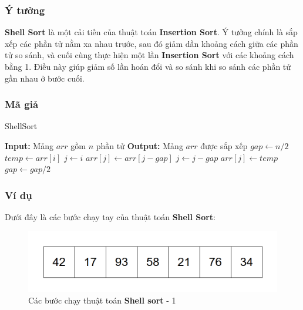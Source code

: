\subsubsection{Ý tưởng}
\textbf{Shell Sort} là một cải tiến của thuật toán \textbf{Insertion Sort}. Ý tưởng chính là sắp xếp các phần tử nằm xa nhau trước, sau đó giảm dần khoảng cách giữa các phần tử so sánh, và cuối cùng thực hiện một lần \textbf{Insertion Sort} với các khoảng cách bằng 1. Điều này giúp giảm số lần hoán đổi và so sánh khi so sánh các phần tử gần nhau ở bước cuối.

\subsubsection{Mã giả}
\begin{algorithm}[H]
\caption{ShellSort}
\begin{algorithmic}[1]
    \State \textbf{Input:} Mảng $arr$ gồm $n$ phần tử
    \State \textbf{Output:} Mảng $arr$ được sắp xếp
    \State $gap \gets n/2$
            \State $temp \gets arr[i]$
            \State $j \gets i$
                \State $arr[j] \gets arr[j - gap]$
                \State $j \gets j - gap$
            \EndWhile
            \State $arr[j] \gets temp$
        \EndFor
        \State $gap \gets gap / 2$
    \EndWhile
\EndProcedure
\end{algorithmic}
\end{algorithm}
\subsubsection{Ví dụ}
Dưới đây là các bước chạy tay của thuật toán \textbf{Shell Sort}:

\begin{figure}[H]
    \centering
    \includegraphics[width=0.5\linewidth]{img/shell_sort/1.png}
    \caption{Các bước chạy thuật toán \textbf{Shell sort} - 1}
\end{figure}

